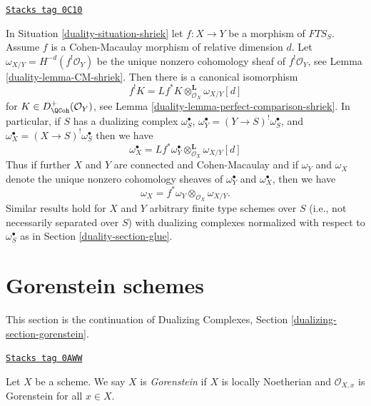 \begin{remark}
\label{duality-remark-CM-morphism-compare-dualizing}
\href{https://stacks.math.columbia.edu/tag/0C10}{\texttt{Stacks tag 0C10}}

In Situation \ref{duality-situation-shriek} let $f : X \to Y$ be a morphism
of $\textit{FTS}_S$. Assume $f$ is a Cohen-Macaulay morphism of
relative dimension $d$. Let $\omega_{X/Y} = H^{-d}(f^!\mathcal{O}_Y)$
be the unique nonzero cohomology sheaf of $f^!\mathcal{O}_Y$, see
Lemma \ref{duality-lemma-CM-shriek}.
Then there is a canonical isomorphism
$$
f^!K = Lf^*K \otimes_{\mathcal{O}_X}^\mathbf{L} \omega_{X/Y}[d]
$$
for $K \in D^+_\QCoh(\mathcal{O}_Y)$, see
Lemma \ref{duality-lemma-perfect-comparison-shriek}. In particular, if
$S$ has a dualizing complex $\omega_S^\bullet$,
$\omega_Y^\bullet = (Y \to S)^!\omega_S^\bullet$, and
$\omega_X^\bullet = (X \to S)^!\omega_S^\bullet$
then we have
$$
\omega_X^\bullet =
Lf^*\omega_Y^\bullet \otimes_{\mathcal{O}_X}^\mathbf{L} \omega_{X/Y}[d]
$$
Thus if further $X$ and $Y$ are connected and Cohen-Macaulay and
if $\omega_Y$ and $\omega_X$ denote the unique nonzero cohomology
sheaves of $\omega_Y^\bullet$ and $\omega_X^\bullet$, then we
have
$$
\omega_X = f^*\omega_Y \otimes_{\mathcal{O}_X} \omega_{X/Y}.
$$
Similar results hold for $X$ and $Y$ arbitrary finite type schemes
over $S$ (i.e., not necessarily separated over $S$)
with dualizing complexes normalized with respect to
$\omega_S^\bullet$ as in Section \ref{duality-section-glue}.
\end{remark}

\section{Gorenstein schemes}
\label{duality-section-gorenstein}
This section is the continuation of Dualizing Complexes, Section
\ref{dualizing-section-gorenstein}.

\begin{definition}[Gorenstein]
\label{duality-definition-gorenstein}
\href{https://stacks.math.columbia.edu/tag/0AWW}{\texttt{Stacks tag 0AWW}}

Let $X$ be a scheme. We say $X$ is {\it Gorenstein} if $X$ is
locally Noetherian and $\mathcal{O}_{X, x}$ is Gorenstein for all $x \in X$.
\end{definition}

